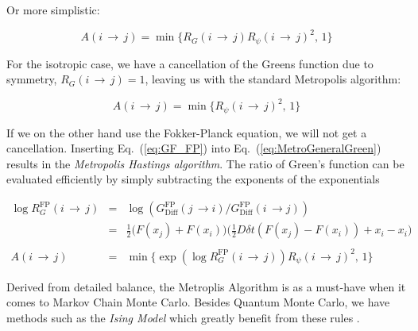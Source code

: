 
Or more simplistic:

\begin{equation}
  A(i\,\rightarrow\,j) = \min\{R_G(i\,\rightarrow\,j)R_\psi(i\,\rightarrow\,j)^2, \,1\}
\end{equation}


For the isotropic case, we have a cancellation of the Greens function due to symmetry, $R_G(i\,\rightarrow\,j) = 1$, leaving us with the standard Metropolis algorithm:

\begin{equation}
\label{eq:Metropolis_standard}
 A(i\,\rightarrow\,j) = \min\{R_\psi(i\,\rightarrow\,j)^2, \,1\}
\end{equation}

If we on the other hand use the Fokker-Planck equation, we will not get a cancellation. Inserting Eq.~(\ref{eq:GF_FP}) into Eq.~(\ref{eq:MetroGeneralGreen}) results in the \textit{Metropolis Hastings algorithm}. The ratio of Green's function can be evaluated efficiently by simply subtracting the exponents of the exponentials

\begin{eqnarray}
 \log{R_G^\mathrm{FP}(i\,\rightarrow\,j)} &=& \log \left(G_\mathrm{Diff}^\mathrm{FP}(j\,\rightarrow i)/G_\mathrm{Diff}^\mathrm{FP}(i\,\rightarrow j)\right) \nonumber \\
                                    &=& \frac{1}{2}\big(F(x_j) + F(x_i)\big)\big(\frac{1}{2}D\delta t(F(x_j) - F(x_i)) + x_i - x_i\big) \\
                                    \nonumber\\
 A(i\,\rightarrow\,j) &=& \min\{\exp \left(\log R_G^\mathrm{FP}(i\,\rightarrow\,j)\right)R_\psi(i\,\rightarrow\,j)^2, \,1\} \label{eq:MetropolisHastings}
\end{eqnarray}

Derived from detailed balance, the Metroplis Algorithm is as a must-have when it comes to Markov Chain Monte Carlo. Besides Quantum Monte Carlo, we have methods such as the \textit{Ising Model} which greatly benefit from these rules \cite{morten}.


